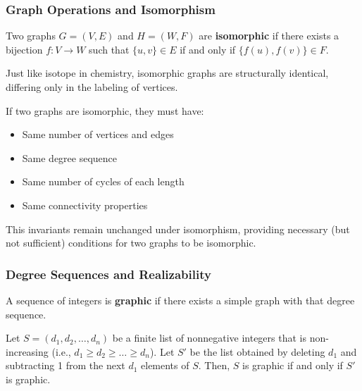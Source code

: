 \documentclass[oneside]{book}
\begin{document}
\subsubsection{Graph Operations and Isomorphism}

\begin{definition}
Two graphs $G = (V, E)$ and $H = (W, F)$ are \textbf{isomorphic} if there exists a bijection $f: V \to W$ such that $\{u, v\} \in E$ if and only if $\{f(u), f(v)\} \in F$.
\end{definition}

Just like isotope in chemistry, isomorphic graphs are structurally identical, differing only in the labeling of vertices.

\begin{theorem}
If two graphs are isomorphic, they must have:
\begin{itemize}
    \item Same number of vertices and edges
    \item Same degree sequence
    \item Same number of cycles of each length
    \item Same connectivity properties
\end{itemize}
\end{theorem}

This invariants remain unchanged under isomorphism, providing necessary (but not sufficient) conditions for two graphs to be isomorphic.

\subsubsection{Degree Sequences and Realizability}
A sequence of integers is \textbf{graphic} if there exists a simple graph with that degree sequence.

\begin{theorem}
Let $S = (d_1, d_2, \dots, d_n)$ be a finite list of nonnegative integers that is non-increasing (i.e., $d_1 \ge d_2 \ge \dots \ge d_n$). Let $S'$ be the list obtained by deleting $d_1$ and subtracting 1 from the next $d_1$ elements of $S$. Then, $S$ is graphic if and only if $S'$ is graphic.
\end{theorem}
\end{document}
